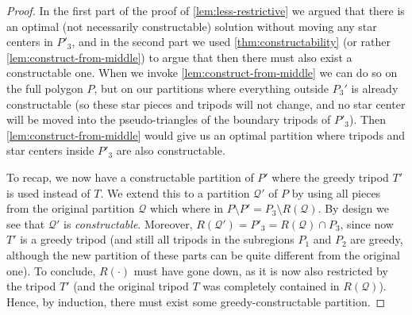 \documentclass[10pt,a4paper]{article}
\begin{document}
\begin{proof}
In the first part of the proof of \cref{lem:less-restrictive} we argued that there is an optimal (not necessarily constructable) solution without moving any star centers in $P'_3$, and in the second part we used \cref{thm:constructability} (or rather \cref{lem:construct-from-middle}) to argue that then there must also exist a constructable one. When we invoke \cref{lem:construct-from-middle} we can do so on the full polygon $P$, but on our partitions where everything outside $P_3'$ is already constructable (so these star pieces and tripods will not change, and no star center will be moved into the pseudo-triangles of the boundary tripods of $P'_3$). Then \cref{lem:construct-from-middle} would give us an optimal partition where tripods and star centers inside $P'_3$ are also constructable.

To recap, we now have a constructable partition of $P'$ where the greedy tripod $T'$ is used instead of $T$. We extend this to a partition $\mathcal{Q}'$ of $P$ by using all pieces from the original partition $\mathcal{Q}$ which where in $P\setminus P' = P_3\setminus R(\mathcal{Q})$. By design we see that $\mathcal{Q}'$ is \emph{constructable}. Moreover, $R(\mathcal{Q'}) = P'_3 = R(\mathcal{Q})\cap P_3$, since now $T'$ is a greedy tripod (and still all tripods in the subregions $P_1$ and $P_2$ are greedy, although the new partition of these parts can be quite different from the original one). To conclude, $R(\cdot)$ must have gone down, as it is now also restricted by the tripod $T'$ (and the original tripod $T$ was completely contained in $R(\mathcal{Q})$). Hence, by induction, there must exist some greedy-constructable partition.
\end{proof}
\end{document}
